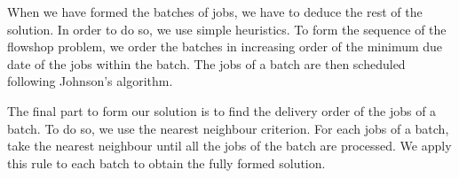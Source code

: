 \documentclass[UTF8, twoside]{EPURapport}
\begin{document}
\clearpage

	When we have formed the batches of jobs, we have to deduce the rest of the solution. In order to do so, we use simple heuristics. To form the sequence of the flowshop problem, we order the batches in increasing order of the minimum due date of the jobs within the batch. The jobs of a batch are then scheduled following Johnson's algorithm.
	
	The final part to form our solution is to find the delivery order of the jobs of a batch. To do so, we use the nearest neighbour criterion. For each jobs of a batch, take the nearest neighbour until all the jobs of the batch are processed. We apply this rule to each batch to obtain the fully formed solution.
\end{document}
